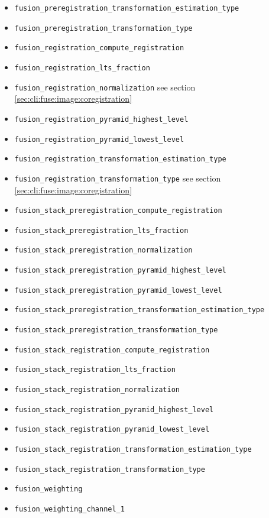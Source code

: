 \begin{itemize}
\item \texttt{fusion\_preregistration\_transformation\_estimation\_type}
\item \texttt{fusion\_preregistration\_transformation\_type}
\item \texttt{fusion\_registration\_compute\_registration}
\item \texttt{fusion\_registration\_lts\_fraction}
\item \texttt{fusion\_registration\_normalization} see section \ref{sec:cli:fuse:image:coregistration}
\item \texttt{fusion\_registration\_pyramid\_highest\_level}
\item \texttt{fusion\_registration\_pyramid\_lowest\_level}
\item \texttt{fusion\_registration\_transformation\_estimation\_type}
\item \texttt{fusion\_registration\_transformation\_type} see section \ref{sec:cli:fuse:image:coregistration}
\item \texttt{fusion\_stack\_preregistration\_compute\_registration}
\item \texttt{fusion\_stack\_preregistration\_lts\_fraction}
\item \texttt{fusion\_stack\_preregistration\_normalization}
\item \texttt{fusion\_stack\_preregistration\_pyramid\_highest\_level}
\item \texttt{fusion\_stack\_preregistration\_pyramid\_lowest\_level}
\item \texttt{fusion\_stack\_preregistration\_transformation\_estimation\_type}
\item \texttt{fusion\_stack\_preregistration\_transformation\_type}
\item \texttt{fusion\_stack\_registration\_compute\_registration}
\item \texttt{fusion\_stack\_registration\_lts\_fraction}
\item \texttt{fusion\_stack\_registration\_normalization}
\item \texttt{fusion\_stack\_registration\_pyramid\_highest\_level}
\item \texttt{fusion\_stack\_registration\_pyramid\_lowest\_level}
\item \texttt{fusion\_stack\_registration\_transformation\_estimation\_type}
\item \texttt{fusion\_stack\_registration\_transformation\_type}
\item \texttt{fusion\_weighting}
\item \texttt{fusion\_weighting\_channel\_1}

\end{itemize}
